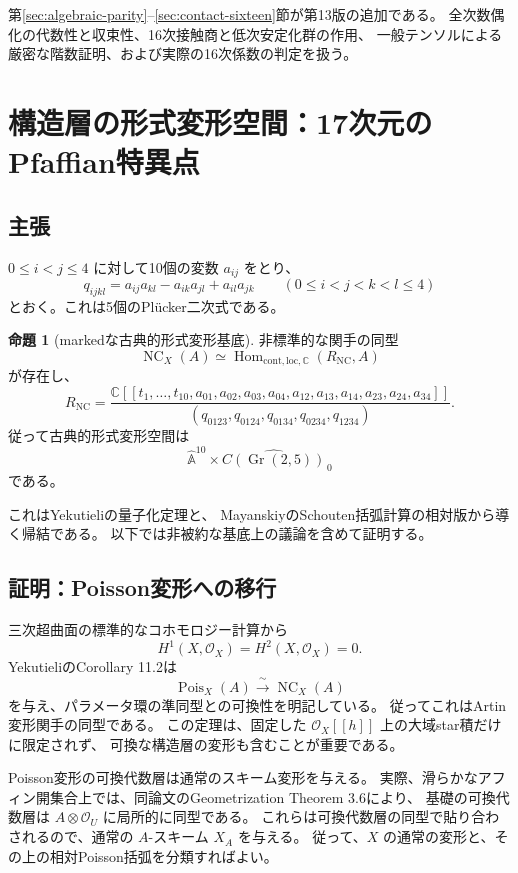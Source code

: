\documentclass[a4paper,11pt]{ltjsarticle}
\theoremstyle{definition}
\newtheorem{theorem}{命題}[section]
\newcommand{\CC}{\mathbb C}
\newcommand{\OO}{\mathcal O}
\newcommand{\Aff}{\mathbb A}
\newcommand{\Gr}{\operatorname{Gr}}
\newcommand{\NC}{\operatorname{NC}}
\newcommand{\Pois}{\operatorname{Pois}}
\begin{document}
第\ref{sec:algebraic-parity}--\ref{sec:contact-sixteen}節が第13版の追加である。
全次数偶化の代数性と収束性、16次接触商と低次安定化群の作用、
一般テンソルによる厳密な階数証明、および実際の16次係数の判定を扱う。




\section{構造層の形式変形空間：17次元のPfaffian特異点}

\subsection{主張}

$0\leq i<j\leq4$ に対して10個の変数 $a_{ij}$ をとり、
\[
 q_{ijkl}=a_{ij}a_{kl}-a_{ik}a_{jl}+a_{il}a_{jk}
 \qquad(0\leq i<j<k<l\leq4)
\]
とおく。これは5個のPlücker二次式である。

\begin{theorem}[markedな古典的形式変形基底]\label{thm:base}
非標準的な関手の同型
\[
 \NC_X(A)\simeq\operatorname{Hom}_{\mathrm{cont,loc},\CC}(R_{\NC},A)
\]
が存在し、
\begin{equation}\label{eq:base}
 R_{\NC}=
 \frac{\CC[[t_1,\ldots,t_{10},a_{01},a_{02},a_{03},a_{04},
                         a_{12},a_{13},a_{14},a_{23},a_{24},a_{34}]]}
 {(q_{0123},q_{0124},q_{0134},q_{0234},q_{1234})}.
\end{equation}
従って古典的形式変形空間は
\[
 \widehat{\Aff}^{10}\times
 \widehat{C(\Gr(2,5))}_{\,0}
\]
である。
\end{theorem}

これはYekutieliの量子化定理\cite[Corollary 11.2]{Yek}と、
MayanskiyのSchouten括弧計算\cite[Section 2.2]{May}の相対版から導く帰結である。
以下では非被約な基底上の議論を含めて証明する。

\subsection{証明：Poisson変形への移行}

三次超曲面の標準的なコホモロジー計算から
\[
 H^1(X,\OO_X)=H^2(X,\OO_X)=0.
\]
YekutieliのCorollary 11.2は
\[
 \Pois_X(A)\xrightarrow{\;\sim\;}\NC_X(A)
\]
を与え、パラメータ環の準同型との可換性を明記している。
従ってこれはArtin変形関手の同型である。
この定理は、固定した $\OO_X[[h]]$ 上の大域star積だけに限定されず、
可換な構造層の変形も含むことが重要である。

Poisson変形の可換代数層は通常のスキーム変形を与える。
実際、滑らかなアフィン開集合上では、同論文のGeometrization Theorem 3.6により、
基礎の可換代数層は $A\otimes\OO_U$ に局所的に同型である。
これらは可換代数層の同型で貼り合わされるので、通常の $A$-スキーム $X_A$ を与える。
従って、$X$ の通常の変形と、その上の相対Poisson括弧を分類すればよい。
\end{document}
